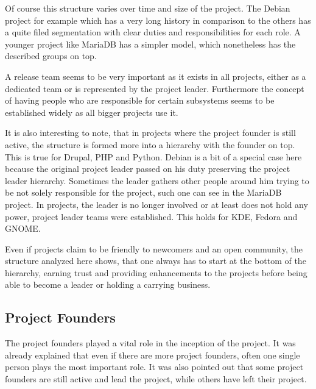 Of course this structure varies over time and size of the project. The Debian
project for example which has a very long history in comparison to the others
has a quite filed segmentation with clear duties and responsibilities for each
role. A younger project like MariaDB has a simpler model, which nonetheless
has the described groups on top.

A release team seems to be very important as it exists in all projects, either
as a dedicated team or is represented by the project leader. Furthermore the
concept of having people who are responsible for certain subsystems seems to be
established widely as all bigger projects use it.

It is also interesting to note, that in projects where the project founder is
still active, the structure is formed more into a hierarchy with the founder on
top. This is true for Drupal, PHP and Python. Debian is a bit of a special case
here because the original project leader passed on his duty preserving the
project leader hierarchy. Sometimes the leader gathers other people around him
trying to be not solely responsible for the project, such one can see in the
MariaDB project. In projects, the leader is no longer involved or at least does
not hold any power, project leader teams were established. This holds for KDE,
Fedora and GNOME.

Even if projects claim to be friendly to newcomers and an open community, the
structure analyzed here shows, that one always has to start at the bottom of
the hierarchy, earning trust and providing enhancements to the projects before
being able to become a leader or holding a carrying business. 


\subsection{Project Founders} %
\label{sub:Project Founders}

The project founders played a vital role in the inception of the project. It
was already explained that even if there are more project founders, often one
single person plays the most important role. It was also pointed out that some
project founders are still active and lead the project, while others have left
their project.

